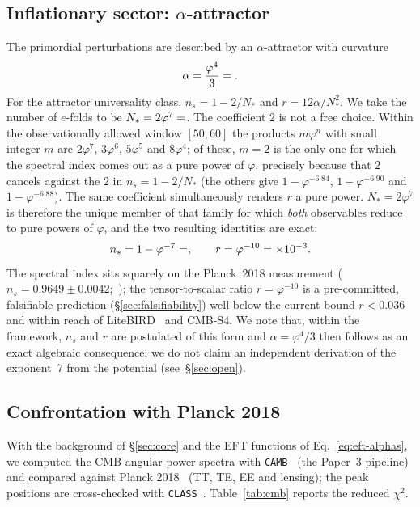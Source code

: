 \documentclass[aps,prd,preprint,amsmath,amssymb,nofootinbib,longbibliography]{revtex4-2}
\begin{document}
\subsection{Inflationary sector: $\alpha$-attractor}
\label{sec:inflation}
The primordial perturbations are described by an $\alpha$-attractor
\citep{Kallosh2013} with curvature
\begin{equation}
  \label{eq:alpha-attractor}
  \alpha=\frac{\varphi^4}{3}=\val{ALPHA_ATT_d6} .
\end{equation}
For the attractor universality class, $n_s=1-2/N_\ast$ and
$r=12\alpha/N_\ast^2$. We take the number of $e$-folds to be
$N_\ast=2\varphi^7=\val{dos_phi7_d6}$. The coefficient $2$ is not a free choice. Within
the observationally allowed window $[50,60]$ the products $m\varphi^n$ with
small integer $m$ are $2\varphi^7$, $3\varphi^6$, $5\varphi^5$ and $8\varphi^4$;
of these, $m=2$ is the only one for which the spectral index comes out as a pure
power of $\varphi$, precisely because that $2$ cancels against the $2$ in
$n_s=1-2/N_\ast$ (the others give $1-\varphi^{-6.84}$, $1-\varphi^{-6.90}$ and
$1-\varphi^{-6.88}$). The same coefficient simultaneously renders $r$ a pure
power. $N_\ast=2\varphi^7$ is therefore the unique member of that family for
which \emph{both} observables reduce to pure powers of $\varphi$, and the two
resulting identities are exact:
\begin{equation}
  \label{eq:ns-r}
  n_s = 1-\varphi^{-7}=\val{N_S_d6} ,
  \qquad
  r   = \varphi^{-10}=\val{r_tensor_mil_d6}\times10^{-3} .
\end{equation}
The spectral index sits squarely on the Planck~2018 measurement
($n_s=0.9649\pm0.0042$;~\citealp{Planck2018}); the tensor-to-scalar ratio
$r=\varphi^{-10}$ is a
pre-committed, falsifiable prediction (\S\ref{sec:falsifiability}) well below
the current bound $r<0.036$~\citep{BICEPKeck2021} and within reach of
LiteBIRD~\citep{LiteBIRD2023} and CMB-S4. We note
that, within the framework, $n_s$ and $r$ are postulated of this form and
$\alpha=\varphi^4/3$ then follows as an exact algebraic consequence; we do not
claim an independent derivation of the exponent~$7$ from the potential
(see~\S\ref{sec:open}).

\subsection{Confrontation with Planck 2018}
\label{sec:cmb-confront}
With the background of \S\ref{sec:core} and the EFT functions of
Eq.~\eqref{eq:eft-alphas}, we computed the CMB angular power spectra with \texttt{CAMB}~\citep{Lewis2000}
(the Paper~3 pipeline) and compared against Planck
2018~\citep{PlanckLikelihood2020} (TT, TE, EE and lensing); the peak positions
are cross-checked with \texttt{CLASS}~\citep{Lesgourgues2011}.
Table~\ref{tab:cmb} reports the reduced $\chi^2$.
\end{document}
